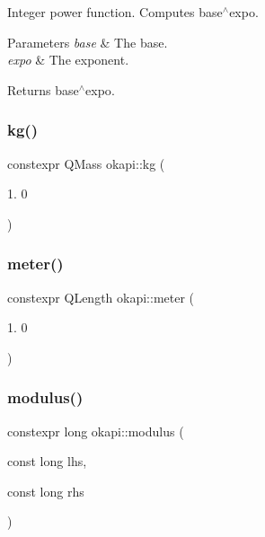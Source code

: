 Integer power function. Computes {\ttfamily base$^\wedge$expo}.


\begin{DoxyParams}{Parameters}
{\em base} & The base. \\
\hline
{\em expo} & The exponent. \\
\hline
\end{DoxyParams}
\begin{DoxyReturn}{Returns}
{\ttfamily base$^\wedge$expo}. 
\end{DoxyReturn}
\mbox{\label{namespaceokapi_afcc67eb55c70e21f82cbee49aa19d05a}} 
\subsubsection{\texorpdfstring{kg()}{kg()}}
{\footnotesize\ttfamily constexpr Q\+Mass okapi\+::kg (\begin{DoxyParamCaption}\item[{1.}]{0 }\end{DoxyParamCaption})}

\mbox{\label{namespaceokapi_a59563b3d4b18633f1c8d852e2932d1db}} 
\subsubsection{\texorpdfstring{meter()}{meter()}}
{\footnotesize\ttfamily constexpr Q\+Length okapi\+::meter (\begin{DoxyParamCaption}\item[{1.}]{0 }\end{DoxyParamCaption})}

\mbox{\label{namespaceokapi_a32aac326b5e0f0ba82bb5dea50852504}} 
\subsubsection{\texorpdfstring{modulus()}{modulus()}}
{\footnotesize\ttfamily constexpr long okapi\+::modulus (\begin{DoxyParamCaption}\item[{const long}]{lhs,  }\item[{const long}]{rhs }\end{DoxyParamCaption})\hspace{0.3cm}{\ttfamily [noexcept]}}

